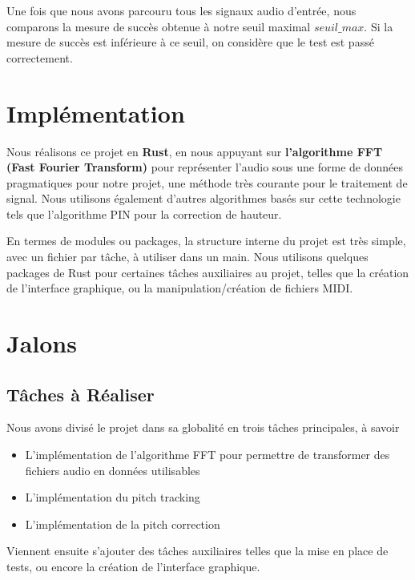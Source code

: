 \documentclass{article}
\begin{document}
Une fois que nous avons parcouru tous les signaux audio d'entrée, nous comparons la mesure de succès obtenue à notre seuil maximal \( \textit{seuil\_max} \). Si la mesure de succès est inférieure à ce seuil, on considère que le test est passé correctement.


\par





\section{Implémentation}

Nous réalisons ce projet en \textbf{Rust}, en nous appuyant sur \textbf{l'algorithme FFT (Fast Fourier Transform)} pour représenter l'audio sous une forme de données pragmatiques pour notre projet, une méthode très courante pour le traitement de signal. Nous utilisons également d'autres algorithmes basés sur cette technologie tels que l'algorithme PIN pour la correction de hauteur.
\par
En termes de modules ou packages, la structure interne du projet est très simple, avec un fichier par tâche, à utiliser dans un main. Nous utilisons quelques packages de Rust pour certaines tâches auxiliaires au projet, telles que la création de l'interface graphique, ou la manipulation/création de fichiers MIDI.

\section{Jalons}

\subsection{Tâches à Réaliser}

Nous avons divisé le projet dans sa globalité en trois tâches principales, à savoir 
\begin{itemize}
  \item L'implémentation de l'algorithme FFT pour permettre de transformer des fichiers audio en données utilisables
  \item L'implémentation du pitch tracking
  \item L'implémentation de la pitch correction
\end{itemize}

Viennent ensuite s'ajouter des tâches auxiliaires telles que la mise en place de tests, ou encore la création de l'interface graphique.
\end{document}
